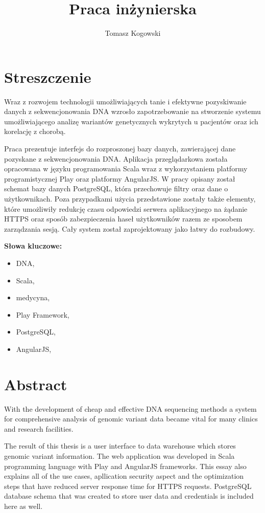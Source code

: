 \documentclass[a4paper,12pt,twoside]{article}
\title{Praca inżynierska}
\author{Tomasz Kogowski}
\begin{document}

\newpage 
\newpage\null\thispagestyle{empty}\newpage
\section*{Streszczenie}

Wraz z rozwojem technologii umożliwiających tanie i efektywne
pozyskiwanie danych z sekwencjonowania DNA wzrosło zapotrzebowanie
na stworzenie systemu umożliwiającego analizę wariantów genetycznych wykrytych u pacjentów oraz ich korelację z chorobą.

Praca prezentuje interfejs do rozproszonej bazy danych, zawierającej dane
pozyskane z sekwencjonowania DNA. Aplikacja przeglądarkowa została opracowana
w języku programowania Scala wraz z wykorzystaniem platformy programistycznej
Play oraz platformy AngularJS. W pracy opisany został schemat bazy danych PostgreSQL, która przechowuje filtry oraz dane o użytkownikach.
Poza przypadkami użycia przedstawione zostały także
elementy, które umożliwiły redukcję czasu odpowiedzi serwera
aplikacyjnego na żądanie HTTPS oraz sposób zabezpieczenia
haseł użytkowników razem ze sposobem zarządzania sesją.
Cały system został zaprojektowany jako łatwy do rozbudowy.

\textbf{Słowa kluczowe:}
\begin{itemize}
\item DNA,
\item Scala,
\item medycyna,
\item Play Framework,
\item PostgreSQL,
\item AngularJS,
\end{itemize}
\newpage
\section*{Abstract}

With the development of cheap and effective DNA sequencing methods
a system for comprehensive analysis of genomic variant data became vital for many clinics and research facilities.

The result of this thesis is a user interface to 
data warehouse which stores genomic variant information. 
The web application was developed in Scala programming language with
Play and AngularJS frameworks. This essay also explains all 
of the use cases, apllication security aspect and the optimization steps that have reduced server response time for HTTPS requests. PostgreSQL database schema that was created to store user data and credentials is included here as well.
\end{document}
